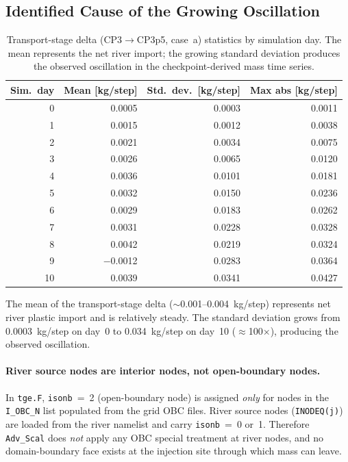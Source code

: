 \documentclass[11pt]{article}
\begin{document}
\subsection*{Identified Cause of the Growing Oscillation}

\begin{table}[h]
\centering
\caption{Transport-stage delta (CP3$\to$CP3p5, case~a) statistics
         by simulation day.  The mean represents the net river import;
         the growing standard deviation produces the observed
         oscillation in the checkpoint-derived mass time series.}
\label{tab:transport_osc}
\small
\begin{tabular}{rrrr}
\toprule
Sim.\ day & Mean [kg/step] & Std.\ dev.\ [kg/step] & Max abs [kg/step] \\
\midrule
0 & 0.0005 & 0.0003 & 0.0011 \\
1 & 0.0015 & 0.0012 & 0.0038 \\
2 & 0.0021 & 0.0034 & 0.0075 \\
3 & 0.0026 & 0.0065 & 0.0120 \\
4 & 0.0036 & 0.0101 & 0.0181 \\
5 & 0.0032 & 0.0150 & 0.0236 \\
6 & 0.0029 & 0.0183 & 0.0262 \\
7 & 0.0031 & 0.0228 & 0.0328 \\
8 & 0.0042 & 0.0219 & 0.0324 \\
9 & $-$0.0012 & 0.0283 & 0.0364 \\
10 & 0.0039 & 0.0341 & 0.0427 \\
\bottomrule
\end{tabular}
\end{table}

The mean of the transport-stage delta ($\sim$0.001--0.004~kg/step)
represents net river plastic import and is relatively steady.
The standard deviation grows from 0.0003~kg/step on day~0 to
0.034~kg/step on day~10 ($\approx$100$\times$), producing the
observed oscillation.

\paragraph{River source nodes are interior nodes, not open-boundary nodes.}
In \texttt{tge.F}, \texttt{isonb}~=~2 (open-boundary node) is assigned
\emph{only} for nodes in the \texttt{I\_OBC\_N} list populated from the
grid OBC files.  River source nodes (\texttt{INODEQ(j)}) are loaded from
the river namelist and carry \texttt{isonb}~=~0 or~1.
Therefore \texttt{Adv\_Scal} does \emph{not} apply any OBC special treatment
at river nodes, and no domain-boundary face exists at the injection site
through which mass can leave.
\end{document}
